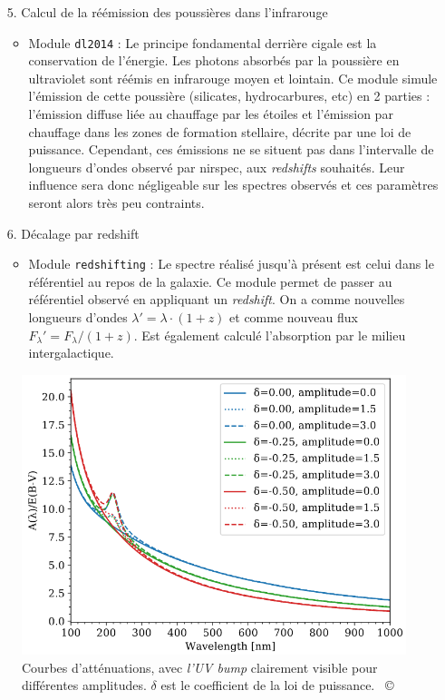 \documentclass[12pt, a4paper]{article}
\newcommand{\customcite}[1]{\mbox{
  {\small \copyright} \cite{#1}}
}
\begin{document}
\begin{itemize}
  \item[5.] Calcul de la réémission des poussières dans l'infrarouge
  \begin{itemize}
    \item Module \texttt{dl2014} : Le principe fondamental derrière \gls{cigale} est la conservation de l'énergie. Les photons absorbés par la poussière en ultraviolet sont réémis en infrarouge moyen et lointain. Ce module simule l'émission de cette poussière (silicates, hydrocarbures, etc) en 2 parties : l'émission diffuse liée au chauffage par les étoiles et l'émission par chauffage dans les zones de formation stellaire, décrite par une loi de puissance. Cependant, ces émissions ne se situent pas dans l'intervalle de longueurs d'ondes observé par \gls{nirspec}, aux \textit{redshifts} souhaités. Leur influence sera donc négligeable sur les spectres observés et ces paramètres seront alors très peu contraints.
    
  \end{itemize}
  \item[6.] Décalage par redshift
  \begin{itemize}
    \item Module \texttt{redshifting} : Le spectre réalisé jusqu'à présent est celui dans le référentiel au repos de la galaxie. Ce module permet de passer au référentiel observé en appliquant un \textit{redshift}. On a comme nouvelles longueurs d'ondes $\lambda' = \lambda \cdot (1+z)$ et comme nouveau flux $F_\lambda' = F_\lambda / (1+z)$. Est également calculé l'absorption par le milieu intergalactique.
  
  \end{itemize}
\end{itemize}

\begin{figure}
  \centering
  \includegraphics[scale=0.5]{assets/absorption_uv.PNG}
  \caption{Courbes d'atténuations, avec \textit{l'UV bump} clairement visible pour différentes amplitudes. $\delta$ est le coefficient de la loi de puissance. \customcite{cigale}}
\end{figure}
\end{document}

